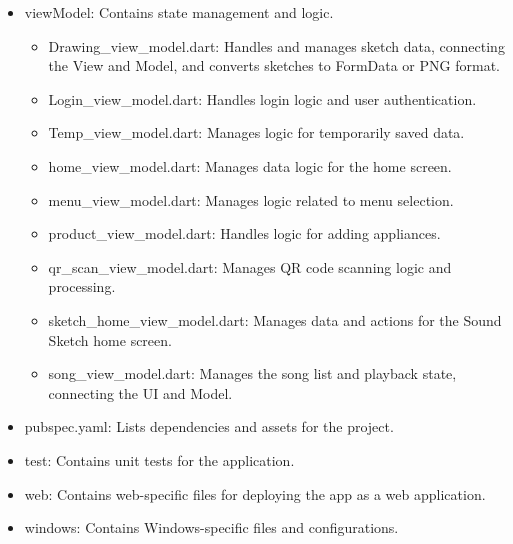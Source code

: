 \documentclass[conference]{IEEEtran}
\begin{document}
\begin{itemize}
\begin{itemize}
\item viewModel: Contains state management and logic.
\begin{itemize}
    \item Drawing\_view\_model.dart: Handles and manages sketch data, connecting the View and Model, and converts sketches to FormData or PNG format. \\
    \item Login\_view\_model.dart: Handles login logic and user authentication. \\
    \item Temp\_view\_model.dart: Manages logic for temporarily saved data. \\
    \item home\_view\_model.dart: Manages data logic for the home screen. \\
    \item menu\_view\_model.dart: Manages logic related to menu selection. \\
    \item product\_view\_model.dart: Handles logic for adding appliances. \\
    \item qr\_scan\_view\_model.dart: Manages QR code scanning logic and processing. \\
    \item sketch\_home\_view\_model.dart: Manages data and actions for the Sound Sketch home screen. \\
    \item song\_view\_model.dart: Manages the song list and playback state, connecting the UI and Model. \\
\end{itemize}
\end{itemize}
        \end{itemize}
\begin{itemize}
    \item pubspec.yaml: Lists dependencies and assets for the project. \\
    \item test: Contains unit tests for the application. \\
    \item web: Contains web-specific files for deploying the app as a web application. \\
    \item windows: Contains Windows-specific files and configurations. \\
\end{itemize}
\end{document}
